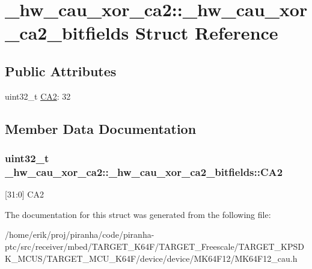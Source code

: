 \hypertarget{struct__hw__cau__xor__ca2_1_1__hw__cau__xor__ca2__bitfields}{}\section{\+\_\+hw\+\_\+cau\+\_\+xor\+\_\+ca2\+:\+:\+\_\+hw\+\_\+cau\+\_\+xor\+\_\+ca2\+\_\+bitfields Struct Reference}
\label{struct__hw__cau__xor__ca2_1_1__hw__cau__xor__ca2__bitfields}
\subsection*{Public Attributes}
\begin{DoxyCompactItemize}
\item 
uint32\+\_\+t \hyperlink{struct__hw__cau__xor__ca2_1_1__hw__cau__xor__ca2__bitfields_a1ed9c49201ccc6670acad05d1c5ff398}{C\+A2}\+: 32
\end{DoxyCompactItemize}


\subsection{Member Data Documentation}
\subsubsection[{\texorpdfstring{C\+A2}{CA2}}]{\setlength{\rightskip}{0pt plus 5cm}uint32\+\_\+t \+\_\+hw\+\_\+cau\+\_\+xor\+\_\+ca2\+::\+\_\+hw\+\_\+cau\+\_\+xor\+\_\+ca2\+\_\+bitfields\+::\+C\+A2}\hypertarget{struct__hw__cau__xor__ca2_1_1__hw__cau__xor__ca2__bitfields_a1ed9c49201ccc6670acad05d1c5ff398}{}\label{struct__hw__cau__xor__ca2_1_1__hw__cau__xor__ca2__bitfields_a1ed9c49201ccc6670acad05d1c5ff398}
\mbox{[}31\+:0\mbox{]} C\+A2 

The documentation for this struct was generated from the following file\+:\begin{DoxyCompactItemize}
\item 
/home/erik/proj/piranha/code/piranha-\/ptc/src/receiver/mbed/\+T\+A\+R\+G\+E\+T\+\_\+\+K64\+F/\+T\+A\+R\+G\+E\+T\+\_\+\+Freescale/\+T\+A\+R\+G\+E\+T\+\_\+\+K\+P\+S\+D\+K\+\_\+\+M\+C\+U\+S/\+T\+A\+R\+G\+E\+T\+\_\+\+M\+C\+U\+\_\+\+K64\+F/device/device/\+M\+K64\+F12/M\+K64\+F12\+\_\+cau.\+h\end{DoxyCompactItemize}
